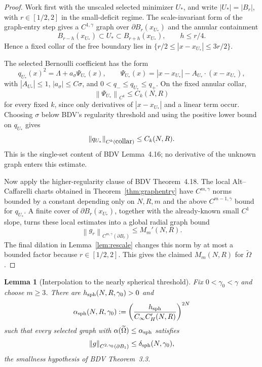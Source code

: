 \documentclass[11pt]{amsart}
\newtheorem{lemma}[theorem]{Lemma}
\theoremstyle{definition}
\newcommand{\norm}[1]{\left\|#1\right\|}
\newcommand{\abs}[1]{\left|#1\right|}
\begin{document}
\begin{proof}
Work first with the unscaled selected minimizer $U_*$, and write
$\abs{U_*}=\abs{B_r}$, with $r\in[1/2,2]$ in the small-deficit regime. The
scale-invariant form of the graph-entry step gives a $C^{1,\gamma}$ graph over
$\partial B_r(x_{U_*})$ and
the annular containment
\[
B_{r-h}(x_{U_*})\subset U_*\subset B_{r+h}(x_{U_*}),\qquad h\le r/4.
\]
Hence a fixed collar of the free boundary lies in
$\{r/2\le\abs{x-x_{U_*}}\le3r/2\}$.

The selected Bernoulli coefficient has the form
\[
q_{U_*}(x)^2=\Lambda+a_\sigma\Psi_{U_*}(x),\qquad
\Psi_{U_*}(x)=\abs{x-x_{U_*}}-A_{U_*}\cdot(x-x_{U_*}),
\]
with $\abs{A_{U_*}}\le1$, $\abs{a_\sigma}\le C\sigma$, and
$0<q_-\le q_{U_*}\le q_+$. On the fixed annular collar,
\[
\norm{\Psi_{U_*}}_{C^k}\le C_k(N,R)
\]
for every fixed $k$, since only derivatives of $\abs{x-x_{U_*}}$ and a linear
term occur. Choosing $\sigma$ below BDV's regularity threshold and using the
positive lower bound on $q_{U_*}$ gives
\[
\norm{q_{U_*}}_{C^k(\hbox{\rm collar})}\le C_k(N,R).
\]
This is the single-set content of BDV Lemma~4.16; no derivative of the unknown
graph enters this estimate.

Now apply the higher-regularity clause of BDV Theorem~4.18. The local
Alt--Caffarelli charts obtained in Theorem~\ref{thm:graphentry} have
$C^{m,\gamma}$ norms bounded by a constant depending only on
$N,R,m$ and the above $C^{m-1,\gamma}$ bound for $q_{U_*}$. A finite cover of
$\partial B_r(x_{U_*})$, together with the already-known small $C^1$ slope,
turns these local estimates into a global radial graph bound
\[
\norm{g_r}_{C^{m,\gamma}(\partial B_r)}\le M_m'(N,R).
\]
The final dilation in Lemma~\ref{lem:rescale} changes this norm by at most a
bounded factor because $r\in[1/2,2]$. This gives the claimed $M_m(N,R)$ for
$\widetilde\Omega$.
\end{proof}

\begin{lemma}[Interpolation to the nearly spherical threshold]\label{lem:interp}
Fix $0<\gamma_0<\gamma$ and choose $m\ge3$. There are
$h_{\rm sph}(N,R,\gamma_0)>0$ and
\[
\alpha_{\rm sph}(N,R,\gamma_0)
:=\left(\frac{h_{\rm sph}}{C_\infty C_H'(N,R)}\right)^{2N}
\]
such that every selected graph with
$\alpha(\widetilde\Omega)\le\alpha_{\rm sph}$ satisfies
\[
\norm{g}_{C^{2,\gamma_0}(\partial B_1)}
\le \delta_{\rm sph}(N,\gamma_0),
\]
the smallness hypothesis of BDV Theorem~3.3.
\end{lemma}
\end{document}

